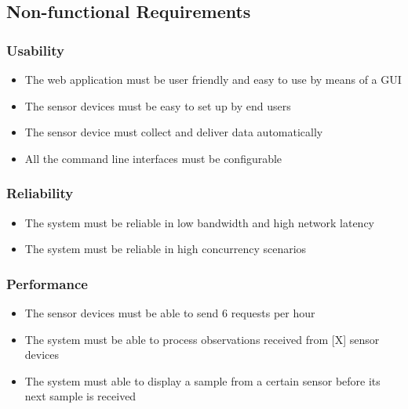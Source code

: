 \begin{usecase}
\end{usecase}

\subsection{Non-functional Requirements}

\subsubsection*{Usability}

\begin{itemize}
	\item The web application must be user friendly and easy to use by means of a GUI
	\item The sensor devices must be easy to set up by end users
	\item The sensor device must collect and deliver data automatically
	\item All the command line interfaces must be configurable
\end{itemize}

\subsubsection*{Reliability}

\begin{itemize}
	\item The system must be reliable in low bandwidth and high network latency
	\item The system must be reliable in high concurrency scenarios
\end{itemize}

\subsubsection*{Performance}

\begin{itemize}
	\item The sensor devices must be able to send 6 requests per hour
	\item The system must be able to process observations received from [X] sensor devices
	\item The system must able to display a sample from a certain sensor before its next sample is received
\end{itemize}

